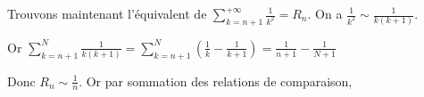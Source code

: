 \begin{exemple}
    Trouvons maintenant l'équivalent de $\displaystyle \sum_{k = n + 1}^{+ \infty } \frac 1 {k^2} = R_n$.
    On a $\displaystyle \frac 1 {k^2} \sim \frac 1 {k(k + 1)}$.

    Or $\displaystyle \sum_{k = n + 1}^{N} \frac 1 {k(k + 1)} = \sum_{k = n + 1}^{N } \left( \frac 1 k - \frac 1 {k + 1} \right) = \frac 1 {n + 1} - \frac 1 {N + 1}$

    Donc $\displaystyle R_n \sim \frac 1 n$.
    Or par sommation des relations de comparaison, 
    
\end{exemple}

